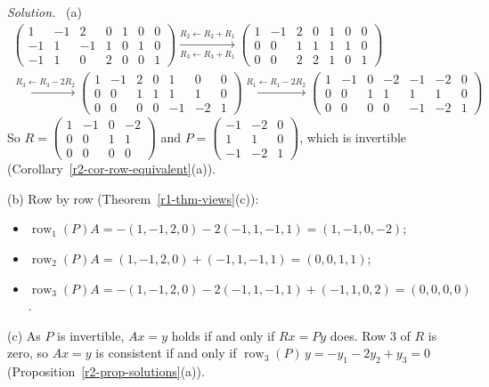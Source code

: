 \documentclass[12pt]{article}
\DeclareMathOperator{\row}{row}
\theoremstyle{definition}
\newenvironment{solution}{\par\noindent\textit{Solution.}\ }{\par\smallskip}
\begin{document}
\begin{solution}
(a)
\[
\begin{gathered}
\left(\begin{array}{cccc|ccc}1&-1&2&0&1&0&0\\-1&1&-1&1&0&1&0\\-1&1&0&2&0&0&1\end{array}\right)
\xrightarrow[R_3\leftarrow R_3+R_1]{R_2\leftarrow R_2+R_1}
\left(\begin{array}{cccc|ccc}1&-1&2&0&1&0&0\\0&0&1&1&1&1&0\\0&0&2&2&1&0&1\end{array}\right)
\\
\xrightarrow{R_3\leftarrow R_3-2R_2}
\left(\begin{array}{cccc|ccc}1&-1&2&0&1&0&0\\0&0&1&1&1&1&0\\0&0&0&0&-1&-2&1\end{array}\right)
\xrightarrow{R_1\leftarrow R_1-2R_2}
\left(\begin{array}{cccc|ccc}1&-1&0&-2&-1&-2&0\\0&0&1&1&1&1&0\\0&0&0&0&-1&-2&1\end{array}\right)
\end{gathered}
\]
So \(R=\left(\begin{smallmatrix}1&-1&0&-2\\0&0&1&1\\0&0&0&0\end{smallmatrix}\right)\) and
\(P=\left(\begin{smallmatrix}-1&-2&0\\1&1&0\\-1&-2&1\end{smallmatrix}\right)\), which is invertible
(Corollary~\ref{r2-cor-row-equivalent}(a)).

(b) Row by row (Theorem~\ref{r1-thm-views}(c)):
\begin{itemize}
\item \(\row_1(P)A=-(1,-1,2,0)-2(-1,1,-1,1)=(1,-1,0,-2)\);
\item \(\row_2(P)A=(1,-1,2,0)+(-1,1,-1,1)=(0,0,1,1)\);
\item \(\row_3(P)A=-(1,-1,2,0)-2(-1,1,-1,1)+(-1,1,0,2)=(0,0,0,0)\).
\end{itemize}
(c) As \(P\) is invertible, \(Ax=y\) holds if and only if \(Rx=Py\) does. Row \(3\) of \(R\) is zero, so
\(Ax=y\) is consistent if and only if \(\row_3(P)\,y=-y_1-2y_2+y_3=0\) (Proposition~\ref{r2-prop-solutions}(a)).
\end{solution}
\end{document}
